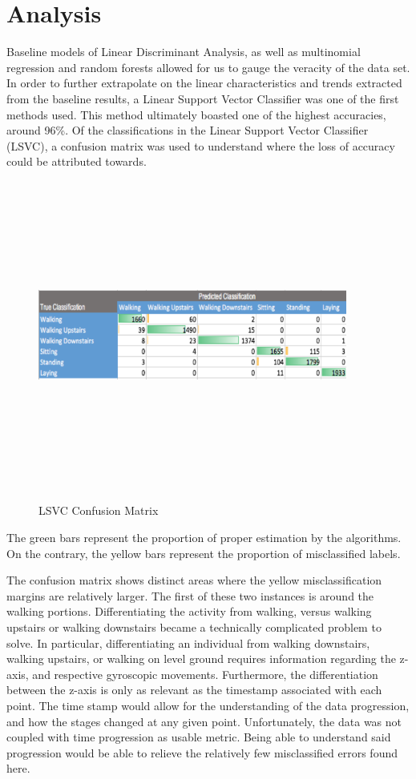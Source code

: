 \documentclass[12pt]{article}
\begin{document}
\section{Analysis}
Baseline models of Linear Discriminant Analysis, as well as multinomial regression and random forests allowed for us to gauge the veracity of the data set. In order to further extrapolate on the linear characteristics and trends extracted from the baseline results, a Linear Support Vector Classifier was one of the first methods used. This method ultimately boasted one of the highest accuracies, around 96\%. 
	Of the classifications in the Linear Support Vector Classifier (LSVC), a confusion matrix was used to understand where the loss of accuracy could be attributed towards. 
\begin{figure}[H]
\caption{LSVC Confusion Matrix}
\centering
{\includegraphics[width=4in,height=4in,keepaspectratio]{LSVCConf}}
\end{figure}
 The green bars represent the proportion of proper estimation by the algorithms. On the contrary, the yellow bars represent the proportion of misclassified labels.
	
	
	
	The confusion matrix shows distinct areas where the yellow misclassification margins are relatively larger. The first of these two instances is around the walking portions. Differentiating the activity from walking, versus walking upstairs or walking downstairs became a technically complicated problem to solve. In particular, differentiating an individual from walking downstairs, walking upstairs, or walking on level ground requires information regarding the z-axis, and respective gyroscopic movements. Furthermore, the differentiation between the z-axis is only as relevant as the timestamp associated with each point. The time stamp would allow for the understanding of the data progression, and how the stages changed at any given point. Unfortunately, the data was not coupled with time progression as usable metric. Being able to understand said progression would be able to relieve the relatively few misclassified errors found here. 
	
\end{document}
